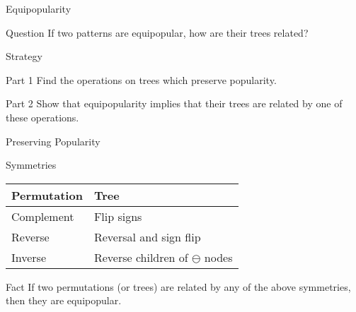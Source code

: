 \documentclass[xcolor=table,dvipsnames]{beamer}
\begin{document}
\begin{frame}{Equipopularity}
  \begin{block}{Question}
    If two patterns are equipopular, how are their trees related?
  \end{block}
\end{frame}


\begin{frame}{Strategy}
  \pause

  \begin{block}{Part 1}
    Find the operations on trees which preserve popularity.
  \end{block}
  \pause
  \begin{block}{Part 2}
    Show that equipopularity implies that their trees are related by one of
    these operations. 
  \end{block}
\end{frame}


\begin{frame}{Preserving Popularity}
  \pause
  \begin{block}{Symmetries}
    \begin{center}
      \begin{tabular}{l|l}
      Permutation & Tree 
      \pause \\
      \hline
      Complement & Flip signs 
      \pause \\
      Reverse & Reversal and sign flip  
      \pause \\
      Inverse & Reverse children of $\ominus$ nodes
      \end{tabular}
    \end{center}
  \end{block}
  \pause
  \begin{block}{Fact}
    If two permutations (or trees) are related by any of the above 
    symmetries, then they are equipopular. 
  \end{block}
\end{frame}
\end{document}
